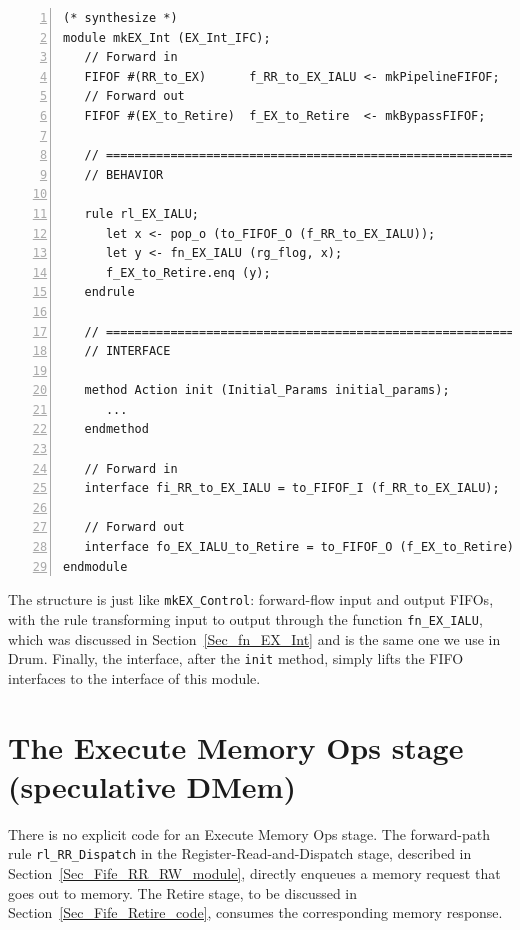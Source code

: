 {\small
\begin{Verbatim}[frame=single, numbers=left, label=(In file:src\_Fife/S4\_EX\_Int.bsv)]
(* synthesize *)
module mkEX_Int (EX_Int_IFC);
   // Forward in
   FIFOF #(RR_to_EX)      f_RR_to_EX_IALU <- mkPipelineFIFOF;
   // Forward out
   FIFOF #(EX_to_Retire)  f_EX_to_Retire  <- mkBypassFIFOF;

   // ================================================================
   // BEHAVIOR

   rule rl_EX_IALU;
      let x <- pop_o (to_FIFOF_O (f_RR_to_EX_IALU));
      let y <- fn_EX_IALU (rg_flog, x);
      f_EX_to_Retire.enq (y);
   endrule

   // ================================================================
   // INTERFACE

   method Action init (Initial_Params initial_params);
      ...
   endmethod

   // Forward in
   interface fi_RR_to_EX_IALU = to_FIFOF_I (f_RR_to_EX_IALU);

   // Forward out
   interface fo_EX_IALU_to_Retire = to_FIFOF_O (f_EX_to_Retire);
endmodule
\end{Verbatim}
}

The structure is just like \verb|mkEX_Control|: forward-flow input and
output FIFOs, with the rule transforming input to output through the
function \verb|fn_EX_IALU|, which was discussed in
Section~\ref{Sec_fn_EX_Int} and is the same one we use in Drum.
Finally, the interface, after the \verb|init| method, simply lifts the
FIFO interfaces to the interface of this module.


\section{The Execute Memory Ops stage (speculative DMem)}

\label{Sec_Fife_DMem_stage}

There is no explicit code for an Execute Memory Ops stage.  The
forward-path rule \verb|rl_RR_Dispatch| in the
Register-Read-and-Dispatch stage, described in
Section~\ref{Sec_Fife_RR_RW_module}, directly enqueues a memory
request that goes out to memory.  The Retire stage, to be discussed in
Section~\ref{Sec_Fife_Retire_code}, consumes the corresponding memory
response.


